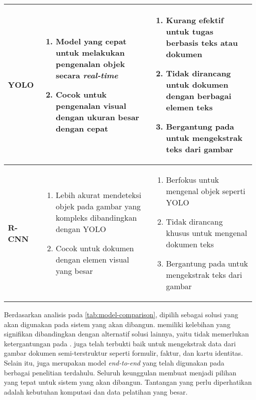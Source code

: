 \begin{table}[h!]
\begin{tabularx}{\linewidth}{|p{2cm}|X|X|}
\textbf{YOLO} &
\begin{enumerate}
    \item Model yang cepat untuk melakukan pengenalan objek secara \textit{real-time}
    \item Cocok untuk pengenalan visual dengan ukuran besar dengan cepat
\end{enumerate}
&
\begin{enumerate}
    \item Kurang efektif untuk tugas berbasis teks atau dokumen
    \item Tidak dirancang untuk dokumen dengan berbagai elemen teks
    \item Bergantung pada \ocr{} untuk mengekstrak teks dari gambar
\end{enumerate}
\\ \hline
\textbf{R-CNN} &
\begin{enumerate}
    \item Lebih akurat mendeteksi objek pada gambar yang kompleks dibandingkan dengan YOLO
    \item Cocok untuk dokumen dengan elemen visual yang besar
\end{enumerate}
&
\begin{enumerate}
    \item Berfokus untuk mengenal objek seperti YOLO
    \item Tidak dirancang khusus untuk mengenal dokumen teks
    \item Bergantung pada \ocr{} untuk mengekstrak teks dari gambar
\end{enumerate}
\\ \hline
\end{tabularx}
\end{table}

Berdasarkan analisis pada \autoref{tab:model-comparison}, \donut{} dipilih sebagai solusi yang akan digunakan pada sistem yang akan dibangun. \donut{} memiliki kelebihan yang signifikan dibandingkan dengan alternatif solusi lainnya, yaitu tidak memerlukan ketergantungan pada \ocr. \donut{} juga telah terbukti baik untuk mengekstrak data dari gambar dokumen semi-terstruktur seperti formulir, faktur, dan kartu identitas. Selain itu, \donut{} juga merupakan model \sota{} \emph{end-to-end} yang telah digunakan pada berbagai penelitian terdahulu. Seluruh keunggulan \donut{} membuat \donut{} menjadi pilihan yang tepat untuk sistem yang akan dibangun. Tantangan yang perlu diperhatikan adalah kebutuhan komputasi dan data pelatihan yang besar. 

